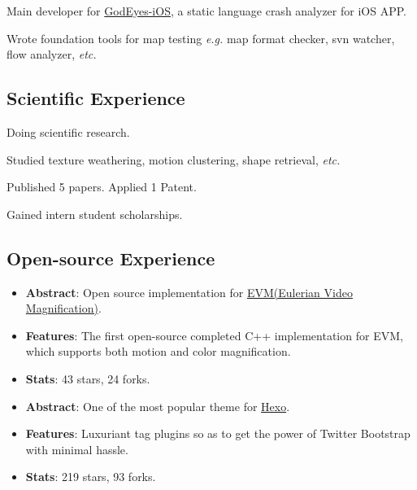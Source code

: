 \documentclass[11pt,a4paper,nolmodern]{moderncv}
\begin{document}
{
\begin{tightitemize}%
 \item Main developer for \href{http://godeyes.duapp.com}{GodEyes-iOS}, a static
   language crash analyzer for iOS APP. 
 \item Wrote foundation tools for
   map testing \textsl{e.g.} map format checker, svn
   watcher, flow analyzer, \textsl{etc.}
 \end{tightitemize}}

\subsection{Scientific Experience}

{Doing scientific research.
\begin{tightitemize}%
 \item Studied texture weathering, motion clustering, shape retrieval, \textsl{etc.}
 \item Published 5 papers. Applied 1 Patent.
 \item Gained intern student scholarships. 
 \end{tightitemize}}

\subsection{Open-source Experience}

%
  {
\begin{itemize}
\item \textbf{Abstract}: Open source implementation for \href{http://people.csail.mit.edu/mrub/vidmag/}{EVM(Eulerian Video Magnification)}.
\item \textbf{Features}: The first open-source completed C++ implementation for EVM, which supports both motion and color magnification.
\item \textbf{Stats}: 43 stars, 24 forks.
\end{itemize}}

%
  {
\begin{itemize}
\item \textbf{Abstract}: One of the most popular theme for \href{hexo.io}{Hexo}.
\item \textbf{Features}: Luxuriant tag plugins so as to get the power of Twitter Bootstrap with minimal hassle.
\item \textbf{Stats}: 219 stars, 93 forks.
\end{itemize}}
\end{document}
